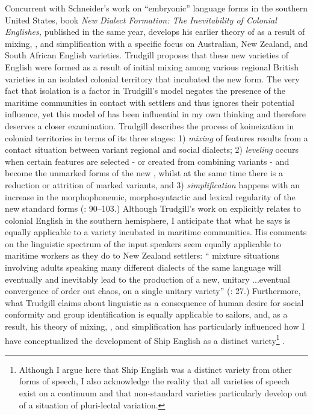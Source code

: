 Concurrent with Schneider’s work on “embryonic” language forms in the southern United States,  book \textit{New Dialect Formation: The Inevitability of Colonial Englishes,} published in the same year, develops his earlier theory of  as a result of mixing, , and simplification with a specific focus on Australian, New Zealand, and South African English varieties. Trudgill proposes that these new varieties of English were formed as a result of initial mixing among various regional British varieties in an isolated colonial territory that incubated the new form. The very fact that isolation is a factor in Trudgill’s model negates the presence of the maritime communities in contact with settlers and thus ignores their potential influence, yet this model of  has been influential in my own thinking and therefore deserves a closer examination. Trudgill describes the process of koineization in colonial territories in terms of its three stages: 1) \textit{mixing} of features results from a contact situation between variant regional and social dialects; 2) \textit{leveling} occurs when certain features are selected - or created from combining variants - and become the unmarked forms of the new , whilst at the same time there is a reduction or attrition of marked variants, and 3) \textit{simplification} happens with an increase in the morphophonemic, morphosyntactic and lexical regularity of the new standard forms (\citealt{Trudgill1986}: 90--103.)  Although Trudgill’s work on  explicitly relates to colonial English in the southern hemisphere, I anticipate that what he says is equally applicable to a variety incubated in maritime communities. His comments on the linguistic spectrum of the input speakers seem equally applicable to maritime workers as they do to New Zealand settlers: “ mixture situations involving adults speaking many different dialects of the same language will eventually and inevitably lead to the production of a new, unitary ...eventual convergence of order out chaos, on a single unitary variety” (\citealt{Trudgill2004}: 27.) Furthermore, what Trudgill claims about linguistic  as a consequence of human desire for social conformity and group identification is equally applicable to sailors, and, as a result, his theory of mixing, , and simplification has particularly influenced how I have conceptualized the development of Ship English as a distinct variety\footnote{Although I argue here that Ship English was a distinct variety from other forms of speech, I also acknowledge the reality that all varieties of speech exist on a continuum and that non-standard varieties particularly develop out of a situation of pluri-lectal variation.} .

